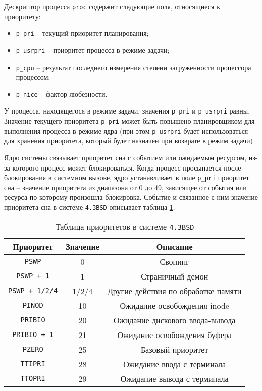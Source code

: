 Дескриптор процесса \texttt{proc} содержит следующие поля, относящиеся к приоритету:
\begin{itemize}
    \item \texttt{p\_pri} – текущий приоритет планирования;
    \item \texttt{p\_usrpri} – приоритет процесса в режиме задачи;
    \item \texttt{p\_cpu} – результат последнего измерения степени загруженности процессора процессом;
    \item \texttt{p\_nice} – фактор любезности.
\end{itemize}

У процесса, находящегося в режиме задачи, значения \texttt{p\_pri} и \texttt{p\_usrpri} равны. Значение текущего приоритета \texttt{p\_pri} может быть повышено планировщиком для выполнения процесса в режиме ядра (при этом \texttt{p\_usrpri} будет использоваться для хранения приоритета, который будет назначен при возврате в режим задачи)

Ядро системы связывает приоритет сна с событием или ожидаемым ресурсом, из-за которого процесс может блокироваться. Когда процесс просыпается после блокирования в системном вызове, ядро устанавливает в поле \texttt{p\_pri} приоритет сна – значение приоритета из диапазона от 0 до 49, зависящее от события или ресурса по которому произошла блокировка. Событие и связанное с ним значение приоритета сна в системе \texttt{4.3BSD} описывает таблица \ref{tab:bsd}.

\begin{table}[h]
    \caption{Таблица приоритетов в системе \texttt{4.3BSD}}
    \label{tab:bsd}
    \begin{center}
        \begin{tabular}{ |c|c|c| }
            \hline
            \textbf{Приоритет} & \textbf{Значение} & \textbf{Описание} \\
            \hline
            \texttt{PSWP} & 0 & Свопинг \\
            \hline
            \texttt{PSWP + 1} & 1 & Страничный демон \\
            \hline
            \texttt{PSWP + 1/2/4} & 1/2/4 & Другие действия по обработке памяти \\
            \hline
            \texttt{PINOD} & 10 & Ожидание освобождения inode \\
            \hline
            \texttt{PRIBIO} & 20 & Ожидание дискового ввода-вывода \\
            \hline
            \texttt{PRIBIO + 1} & 21 & Ожидание освобождения буфера \\
            \hline
            \texttt{PZERO} & 25 & Базовый приоритет \\
            \hline
            \texttt{TTIPRI} & 28 & Ожидание ввода с терминала \\
            \hline
            \texttt{TTOPRI} & 29 & Ожидание вывода с терминала \\
            \hline
        \end{tabular}
    \end{center}
\end{table}

